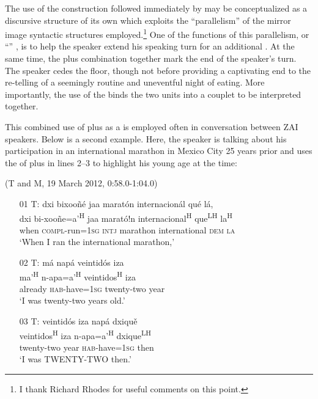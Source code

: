 The use of the  construction followed immediately by  may be conceptualized as a discursive structure of its own which exploits the ``parallelism'' \citep{jakobson1966,fox1977} of the mirror image syntactic structures employed.\footnote{I thank Richard Rhodes for useful comments on this point.} One of the functions of this parallelism, or ``'' \citep{silverstein1984}, is to help the speaker extend his speaking turn for an additional . At the same time, the  plus  combination together mark the end of the speaker's turn. The speaker cedes the floor, though not before providing a captivating end to the re-telling of a seemingly routine and uneventful night of eating. More importantly, the use of the  binds the two  units into a couplet to be interpreted together.

This combined use of  plus  as a  is employed often in conversation between ZAI speakers. Below is a second example. Here, the speaker is talking about his participation in an international marathon in Mexico City 25 years prior and uses the  of  plus  in lines 2--3 to highlight his young age at the time:

\ea (T and M, 19 March 2012, 0:58.0-1:04.0)
\begin{itemize}

\item[01 T:] 
\glll dxi bixoo\~{n}\'{e} jaa marat\'{o}n internacion\'{a}l qu\'{e} l\'{a}, \\
dxi bi-xoo\~{n}e=a'\textsuperscript{H} jaa marat\'{o}!n internacional\textsuperscript{H} que\textsuperscript{LH} la\textsuperscript{H} \\
when \textsc{compl}-run=\textsc{1sg} \textsc{intj} marathon international \textsc{dem} \textsc{la} \\
\glt `When I ran the international marathon,'


\item[02 T:] 
\glll m\'{a} nap\'{a} veintid\'{o}s iza \\
 ma'\textsuperscript{H} n-apa=a'\textsuperscript{H} veintidos\textsuperscript{H} iza \\
already \textsc{hab}-have=\textsc{1sg} twenty-two year \\
\glt `I was twenty-two years old.' 


\item[03 T:] 
\glll veintid\'{o}s iza nap\'{a} dxiqu\v{e} \\
veintidos\textsuperscript{H} iza n-apa=a'\textsuperscript{H} dxique\textsuperscript{LH} \\
twenty-two year \textsc{hab}-have=\textsc{1sg} then \\
\glt `I was TWENTY-TWO then.' 


\end{itemize}
\z

